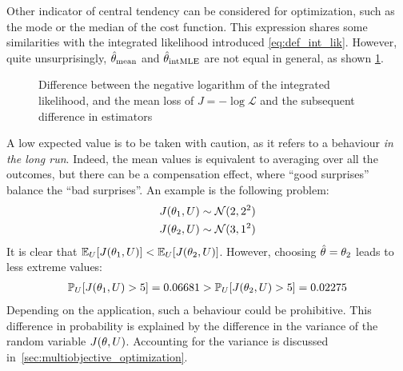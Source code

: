\documentclass[../../Main_ManuscritThese.tex]{subfiles}
\newcommand\imgpath{/home/victor/acadwriting/Manuscrit/Text/Chapter3/img/}
\begin{document}
Other indicator of central tendency can be considered for optimization, such as the mode or the median of the cost function. 
This expression shares some similarities with the integrated likelihood introduced \cref{eq:def_int_lik}. However, quite unsurprisingly, $\hat{\theta}_{\mathrm{mean}}$ and $\hat{\theta}_{\mathrm{intMLE}}$ are not equal in general, as shown \cref{fig:difference_arithmetic_geometric_mean}.
\begin{figure}[ht]
  \centering
  
  \caption{\label{fig:difference_arithmetic_geometric_mean} Difference between the negative logarithm of the integrated likelihood, and the mean loss of $J = -\log \mathcal{L}$ and the subsequent difference in estimators}
\end{figure}



A low expected value is to be taken with caution, as it refers to a behaviour \emph{in the long run}. Indeed, the mean values is equivalent to averaging over all the outcomes, but there can be a compensation effect, where ``good surprises'' balance the ``bad surprises''.
An example is the following problem:
\begin{align}
  J(\theta_1, U) &\sim \mathcal{N}(2, 2^2) \\
  J(\theta_2, U) & \sim \mathcal{N}(3, 1^2)
\end{align}
It is clear that $\mathbb{E}_{U}[J(\theta_1, U)] < \mathbb{E}_{U}[J(\theta_2, U)]$. However, choosing $\hat{\theta}_{\mathrm{}} = \theta_2$ leads to less extreme values:
\begin{align}
  \mathbb{P}_{U}[J(\theta_1, U) > 5] = 0.06681> \mathbb{P}_{U}[J(\theta_2, U) > 5] = 0.02275
\end{align}
Depending on the application, such a behaviour could be prohibitive.
This difference in probability is explained by the difference in the variance of the random variable $J(\theta, U)$.
Accounting for the variance is discussed in~\cref{sec:multiobjective_optimization}.
\end{document}
